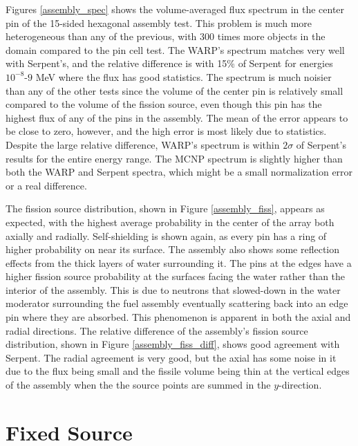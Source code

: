 Figures \ref{assembly_spec} shows the volume-averaged flux spectrum in the center pin of the 15-sided hexagonal assembly test.  This problem is much more heterogeneous than any of the previous, with 300 times more objects in the domain compared to the pin cell test.  The WARP's spectrum matches very well with Serpent's, and the relative difference is with 15\% of Serpent  for energies $10^{-8}$-$9$ MeV where the flux has good statistics.  The spectrum is much noisier than any of the other tests since the volume of the center pin is relatively small compared to the volume of the fission source, even though this pin has the highest flux of any of the pins in the assembly.  The mean of the error appears to be close to zero, however, and the high error is most likely due to statistics.  Despite the large relative difference, WARP's spectrum is within $2\sigma$ of Serpent's results for the entire energy range.  The MCNP spectrum is slightly higher than both the WARP and Serpent spectra, which might be a small normalization error or a real difference.  

The fission source distribution, shown in Figure \ref{assembly_fiss}, appears as expected, with the highest average probability in the center of the array both axially and radially.  Self-shielding is shown again, as every pin has a ring of higher probability on near its surface.  The assembly also shows some reflection effects from the thick layers of water surrounding it.  The pins at the edges have a higher fission source probability at the surfaces facing the water rather than the interior of the assembly.  This is due to neutrons that slowed-down in the water moderator surrounding the fuel assembly eventually scattering back into an edge pin where they are absorbed.  This phenomenon is apparent in both the axial and radial directions.  The relative difference of the assembly's fission source distribution, shown in Figure \ref{assembly_fiss_diff}, shows good agreement with Serpent.  The radial agreement is very good, but the axial has some noise in it due to the flux being small and the fissile volume being thin at the vertical edges of the assembly when the the source points are summed in the $y$-direction.  


\section{Fixed Source}

